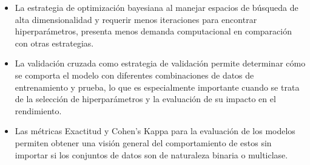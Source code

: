 \begin{itemize}
	\item La estrategia de optimización bayesiana al manejar espacios de búsqueda de alta dimensionalidad y requerir menos iteraciones para encontrar hiperparámetros, presenta menos demanda computacional en comparación con otras estrategias.
	\item La validación cruzada como estrategia de validación permite determinar cómo se comporta el modelo con diferentes combinaciones de datos de entrenamiento y prueba, lo que es especialmente importante cuando se trata de la selección de hiperparámetros y la evaluación de su impacto en el rendimiento.
	\item Las métricas Exactitud y Cohen's Kappa para la evaluación de los modelos permiten obtener una visión general del comportamiento de estos sin importar si los conjuntos de datos son de naturaleza binaria o multiclase.
\end{itemize}













\pagebreak
